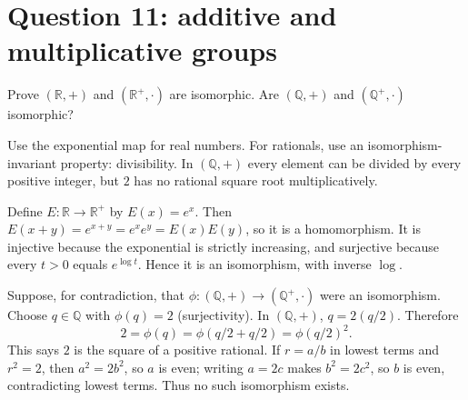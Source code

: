 \documentclass[11pt,openany]{book}
\newcommand{\Q}{\mathbb Q}\newcommand{\R}{\mathbb R}
\begin{document}
\section{Question 11: additive and multiplicative groups}
\begin{questionbox}
Prove $(\R,+)$ and $(\R^+,\cdot)$ are isomorphic. Are $(\Q,+)$ and $(\Q^+,\cdot)$ isomorphic?
\end{questionbox}
\begin{approachbox}
Use the exponential map for real numbers. For rationals, use an isomorphism-invariant property: divisibility. In $(\Q,+)$ every element can be divided by every positive integer, but $2$ has no rational square root multiplicatively.
\end{approachbox}
\begin{solutionbox}
Define $E:\R\to\R^+$ by $E(x)=e^x$. Then
$E(x+y)=e^{x+y}=e^xe^y=E(x)E(y)$, so it is a homomorphism. It is injective because the exponential is strictly increasing, and surjective because every $t>0$ equals $e^{\log t}$. Hence it is an isomorphism, with inverse $\log$.

Suppose, for contradiction, that $\phi:(\Q,+)\to(\Q^+,\cdot)$ were an isomorphism. Choose $q\in\Q$ with $\phi(q)=2$ (surjectivity). In $(\Q,+)$, $q=2(q/2)$. Therefore
\[
2=\phi(q)=\phi(q/2+q/2)=\phi(q/2)^2.
\]
This says $2$ is the square of a positive rational. If $r=a/b$ in lowest terms and $r^2=2$, then $a^2=2b^2$, so $a$ is even; writing $a=2c$ makes $b^2=2c^2$, so $b$ is even, contradicting lowest terms. Thus no such isomorphism exists.
\end{solutionbox}
\end{document}
